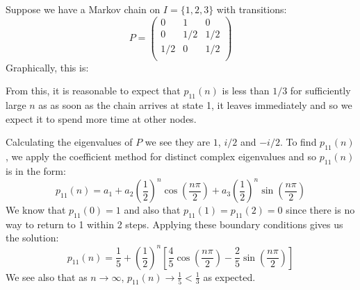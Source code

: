 \documentclass[../main.tex]{subfiles}
\begin{document}
\begin{example}
  Suppose we have a Markov chain on $I = \{1, 2, 3\}$ with transitions:
  \[
    P = \begin{pmatrix}
    0 & 1 & 0 \\
    0 & 1/2 & 1/2 \\
    1/2 & 0 & 1/2 \\
    \end{pmatrix}
  \]
  Graphically, this is:
  \begin{center}
  \end{center}
  From this, it is reasonable to expect that $p_{1 1}(n)$ is less than $1/3$ for sufficiently large $n$ as as soon as the chain arrives at state 1, it leaves immediately and so we expect it to spend more time at other nodes.

  Calculating the eigenvalues of $P$ we see they are $1$, $i/2$ and $-i/2$.
  To find $p_{1 1}(n)$, we apply the coefficient method for distinct complex eigenvalues and so $p_{1 1}(n)$ is in the form:
  \[
    p_{1 1}(n) = a_1 + a_2 \left(\frac{1}{2}\right)^n \cos \left(\frac{n \pi}{2}\right) + a_3 \left(\frac{1}{2}\right)^n \sin\left(\frac{n \pi}{2}\right)
  \]
  We know that $p_{1 1}(0) = 1$ and also that $p_{1 1}(1) = p_{1 1}(2) = 0$ since there is no way to return to 1 within 2 steps.
  Applying these boundary conditions gives us the solution:
  \[
    p_{1 1}(n) = \frac{1}{5} + \left(\frac{1}{2}\right)^n \left[\frac{4}{5} \cos\left(\frac{n\pi}{2}\right) - \frac{2}{5} \sin\left(\frac{n\pi}{2}\right)\right]
  \]
  We see also that as $n \to \infty$, $p_{1 1}(n) \to \frac{1}{5} < \frac{1}{3}$ as expected.
\end{example}
\end{document}
